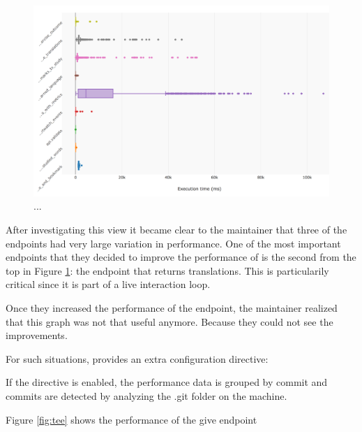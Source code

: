 \documentclass[conference]{IEEEtran}
\begin{document}
  \begin{figure}[h!]
    \centering
    \includegraphics[width=\linewidth]{endpoint_performance.png}
    \caption{...}
    \label{fig:ep}
  \end{figure}

  After investigating this view it became clear to the maintainer that three of the endpoints had very large variation in performance. One of the most important endpoints that they decided to improve the performance of is the second from the top in Figure \ref{fig:ep}: the endpoint that returns translations. This is particularily critical since it is part of a live interaction loop. 

  \niceseparator

  Once they increased the performance of the endpoint, the maintainer realized that this graph was not that useful anymore. Because they could not see the improvements. 

  For such situations, \tool provides an extra configuration directive:


  If the directive is enabled, the performance data is grouped by commit and commits are detected by analyzing the .git folder on the machine. 

  Figure \ref{fig:tee} shows the performance of the give endpoint 
\end{document}
